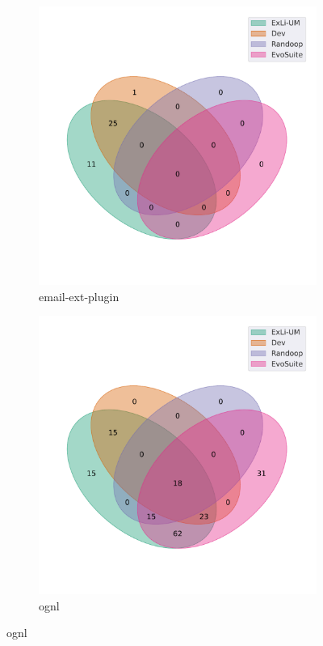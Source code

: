 \begin{figure}[t]\ContinuedFloat
\begin{subfigure}[b]{0.45\textwidth}
\includegraphics[width=\textwidth]{figures/venn/jenkinsci_email-ext-plugin-venn.pdf}
\vspace{-10pt}
\caption{email-ext-plugin}
\label{fig:venn-jenkinsci_email-ext-plugin}
\end{subfigure}
\hfill
\begin{subfigure}[b]{0.45\textwidth}
\includegraphics[width=\textwidth]{figures/venn/jkuhnert_ognl-venn.pdf}
\vspace{-10pt}
\caption{ognl}
\label{fig:venn-jkuhnert_ognl}
\end{subfigure}
\end{figure}
